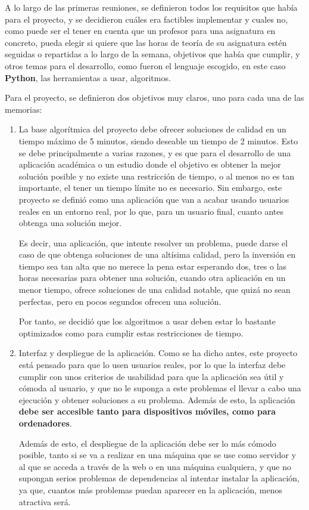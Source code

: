 A lo largo de las primeras reuniones, se definieron todos los requisitos que había para el proyecto, y se decidieron cuáles era factibles implementar y cuales no, como puede ser el tener en cuenta que un profesor para una asignatura en concreto, pueda elegir si quiere que las horas de teoría de su asignatura estén seguidas o repartidas a lo largo de la semana, objetivos que había que cumplir, y otros temas para el desarrollo, como fueron el lenguaje escogido, en este caso \textbf{Python}, las herramientas a usar, algoritmos.

Para el proyecto, se definieron dos objetivos muy claros, uno para cada una de las memorias:
\begin{enumerate}
    \item La base algorítmica del proyecto debe ofrecer soluciones de calidad en un tiempo máximo de 5 minutos, siendo deseable un tiempo de 2 minutos. Esto se debe principalmente a varias razones, y es que para el desarrollo de una aplicación académica o un estudio donde el objetivo es obtener la mejor solución posible y no existe una restricción de tiempo, o al menos no es tan importante, el tener un tiempo límite no es necesario. Sin embargo, este proyecto se definió como una aplicación que van a acabar usando usuarios reales en un entorno real, por lo que, para un usuario final, cuanto antes obtenga una solución mejor. 

    Es decir, una aplicación, que intente resolver un problema, puede darse el caso de que obtenga soluciones de una altísima calidad, pero la inversión en tiempo sea tan alta que no merece la pena estar esperando dos, tres o las horas necesarias para obtener una solución, cuando otra aplicación en un menor tiempo, ofrece soluciones de una calidad notable, que quizá no sean perfectas, pero en pocos segundos ofrecen una solución.

    Por tanto, se decidió que los algoritmos a usar deben estar lo bastante optimizados como para cumplir estas restricciones de tiempo.


    \item Interfaz y despliegue de la aplicación. Como se ha dicho antes, este proyecto está pensado para que lo usen usuarios reales, por lo que la interfaz debe cumplir con unos criterios de usabilidad para que la aplicación sea útil y cómoda al usuario, y que no le suponga a este problemas el llevar a cabo una ejecución y obtener soluciones a su problema. Además de esto, la aplicación \textbf{debe ser accesible tanto para dispositivos móviles, como para ordenadores}.

    Además de esto, el despliegue de la aplicación debe ser lo más cómodo posible, tanto si se va a realizar en una máquina que se use como servidor y al que se acceda a través de la web o en una máquina cualquiera, y que no supongan serios problemas de dependencias al intentar instalar la aplicación, ya que, cuantos más problemas puedan aparecer en la aplicación, menos atractiva será.
\end{enumerate}

